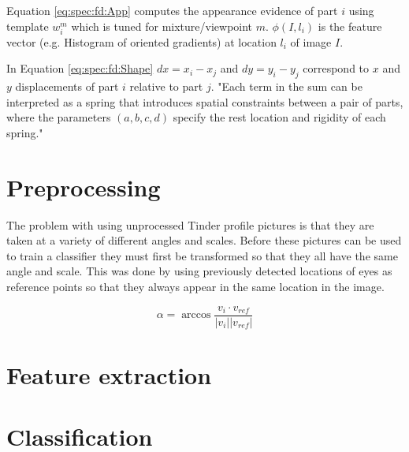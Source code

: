 Equation \ref{eq:spec:fd:App} computes the appearance evidence of part $i$ 
using template $w_i^m$ which is tuned for mixture/viewpoint $m$. $\phi(I,l_i)$ 
is the feature vector (e.g. Histogram of oriented gradients) at location $l_i$ 
of image $I$.

In Equation \ref{eq:spec:fd:Shape} $dx = x_i  - x_j$ and $dy = y_i - y_j$ correspond to $x$ and $y$ 
displacements of part $i$ relative to part $j$. "Each term in the sum can be 
interpreted as a spring that introduces spatial constraints between a pair of parts,
where the parameters $(a,b,c,d)$ specify the rest location and rigidity of each spring." \citep{zhu2012face}


\section{Preprocessing}
\label{spec:preproc}
The problem with using unprocessed Tinder profile pictures is that they are 
taken at a variety of different angles and scales. Before these pictures can 
be used to train a classifier they must first be transformed so that they all 
have the same angle and scale. This was done by using previously detected 
locations of eyes as reference points so that they always appear in the same 
location in the image. 

\begin{equation}
\label{eq:a}
\alpha = \arccos{\frac{v_{i} \cdot v_{ref}}{|v_{i}| |v_{ref}|}}
\end{equation}


 
\section{Feature extraction}


\section{Classification}

